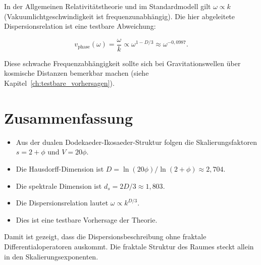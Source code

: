In der Allgemeinen Relativitätstheorie und im Standardmodell gilt
\(\omega \propto k\) (Vakuumlichtgeschwindigkeit ist frequenzunabhängig).
Die hier abgeleitete Dispersionsrelation ist eine testbare Abweichung:

\[
v_{\text{phase}}(\omega) = \frac{\omega}{k} \propto \omega^{1 - D/3}
                         \approx \omega^{-0,0987}.
\]

Diese schwache Frequenzabhängigkeit sollte sich bei Gravitationswellen
über kosmische Distanzen bemerkbar machen (siehe Kapitel~\ref{ch:testbare_vorhersagen}).

\section{Zusammenfassung}
\label{app:spektrale_zusammenfassung}

\begin{itemize}
    \item Aus der dualen Dodekaeder-Ikosaeder-Struktur folgen die
          Skalierungsfaktoren \(s = 2+\phi\) und \(V = 20\phi\).
    \item Die Hausdorff-Dimension ist \(D = \ln(20\phi)/\ln(2+\phi)
          \approx 2,704\).
    \item Die spektrale Dimension ist \(d_s = 2D/3 \approx 1,803\).
    \item Die Dispersionsrelation lautet \(\omega \propto k^{D/3}\).
    \item Dies ist eine testbare Vorhersage der Theorie.
\end{itemize}

Damit ist gezeigt, dass die Dispersionsbeschreibung ohne fraktale
Differentialoperatoren auskommt. Die fraktale Struktur des Raumes
steckt allein in den Skalierungsexponenten.